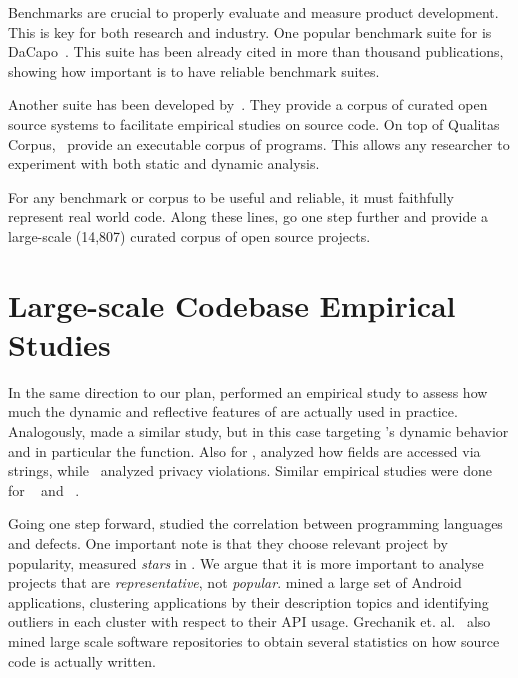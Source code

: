 Benchmarks are crucial to properly evaluate and measure product development.
This is key for both research and industry.
One popular benchmark suite for \java{} is DaCapo~\cite{blackburnDaCapoBenchmarksJava2006}.
This suite has been already cited in more than thousand publications, showing how important is to have reliable benchmark suites.

Another suite has been developed by~\cite{temperoQualitasCorpusCurated2010}.
They provide a corpus of curated open source systems to facilitate empirical studies on source code.
On top of Qualitas Corpus,~\cite{dietrichXCorpusExecutableCorpus2017} provide an executable corpus of \java{} programs.
This allows any researcher to experiment with both static and dynamic analysis.

For any benchmark or corpus to be useful and reliable, it must faithfully represent real world code.
Along these lines, \cite{allamanisMiningSourceCode2013} go one step further and provide a large-scale (14,807) curated corpus of open source \java{} projects.

\section{Large-scale Codebase Empirical Studies}
\label{sec:lr:largescale}

In the same direction to our plan, \cite{callauHowWhyDevelopers2013} performed an empirical study to assess how much the dynamic and reflective features of \smalltalk{} are actually used in practice.
Analogously, \cite{richardsAnalysisDynamicBehavior2010,richardsEvalThatMen2011} made a similar study, but in this case targeting \javascript{}'s dynamic behavior and in particular the  function. 
Also for \javascript{}, \cite{madsenStringAnalysisDynamic2014} analyzed how fields are accessed via strings, while~\cite{jangEmpiricalStudyPrivacyviolating2010} analyzed privacy violations. 
Similar empirical studies were done for \php{}~\cite{hillsEmpiricalStudyPHP2013,dahseExperienceReportEmpirical2015,doyleEmpiricalStudyEvolution2011} and \swift{}~\cite{reboucasEmpiricalStudyUsage2016}.  

Going one step forward, \cite{rayLargescaleStudyProgramming2017} studied the correlation between programming languages and defects. 
One important note is that they choose relevant project by popularity, measured \emph{stars} in \github{}.
We argue that it is more important to analyse projects that are \emph{representative}, not \emph{popular}. 
\cite{gorlaCheckingAppBehavior2014} mined a large set of Android applications, clustering applications by their description topics and identifying outliers in each cluster with respect to their API usage.
Grechanik et. al.~\cite{grechanikEmpiricalInvestigationLargescale2010} also mined large scale software repositories to obtain several statistics on how source code is actually written.

